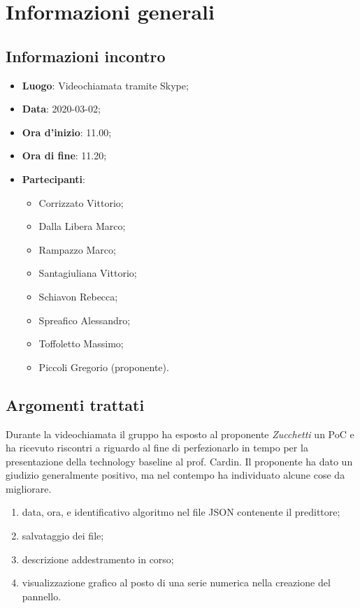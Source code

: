 \section{Informazioni generali}
    \subsection{Informazioni incontro}
        \begin{itemize}
            \item \textbf{Luogo}: Videochiamata tramite Skype;
            \item \textbf{Data}: 2020-03-02;
            \item \textbf{Ora d'inizio}: 11.00;
            \item \textbf{Ora di fine}: 11.20;
            \item \textbf{Partecipanti}: 
            \begin{itemize}
                \item Corrizzato Vittorio;
                \item Dalla Libera Marco;
                \item Rampazzo Marco;
                \item Santagiuliana Vittorio;
                \item Schiavon Rebecca;
                \item Spreafico Alessandro;
                \item Toffoletto Massimo;
                \item Piccoli Gregorio (proponente).
            \end{itemize}
        \end{itemize}
    \subsection{Argomenti trattati}
        Durante la videochiamata il gruppo ha esposto al proponente \textit{Zucchetti} un PoC e ha ricevuto riscontri a riguardo al fine di perfezionarlo in tempo per la presentazione della technology baseline al prof. Cardin.
        Il proponente ha dato un giudizio generalmente positivo, ma nel contempo ha individuato alcune cose da migliorare.
        \begin{enumerate}
            \item data, ora, e identificativo algoritmo nel file JSON contenente il predittore;
            \item salvataggio dei file;
            \item descrizione addestramento in corso;
            \item visualizzazione grafico al posto di una serie numerica nella creazione del pannello.  
        \end{enumerate}
